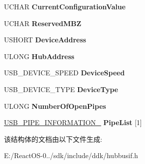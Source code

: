 \begin{DoxyCompactItemize}
U\+C\+H\+AR {\bfseries Current\+Configuration\+Value}
\item 
\mbox{\label{struct___u_s_b___d_e_v_i_c_e___i_n_f_o_r_m_a_t_i_o_n__0_af675a993c8131768d2fb1d2ddbf6871f}} 
U\+C\+H\+AR {\bfseries Reserved\+M\+BZ}
\item 
\mbox{\label{struct___u_s_b___d_e_v_i_c_e___i_n_f_o_r_m_a_t_i_o_n__0_a1e09fe3e7b8dc224665526937130a1e4}} 
U\+S\+H\+O\+RT {\bfseries Device\+Address}
\item 
\mbox{\label{struct___u_s_b___d_e_v_i_c_e___i_n_f_o_r_m_a_t_i_o_n__0_ac5866ef095055cfd24660c3d5ed287cd}} 
U\+L\+O\+NG {\bfseries Hub\+Address}
\item 
\mbox{\label{struct___u_s_b___d_e_v_i_c_e___i_n_f_o_r_m_a_t_i_o_n__0_a1c03de1128fbc85b3750c3e202f8ee24}} 
U\+S\+B\+\_\+\+D\+E\+V\+I\+C\+E\+\_\+\+S\+P\+E\+ED {\bfseries Device\+Speed}
\item 
\mbox{\label{struct___u_s_b___d_e_v_i_c_e___i_n_f_o_r_m_a_t_i_o_n__0_a6aa8ad8e4b25876c65af164bf9dfd7f8}} 
U\+S\+B\+\_\+\+D\+E\+V\+I\+C\+E\+\_\+\+T\+Y\+PE {\bfseries Device\+Type}
\item 
\mbox{\label{struct___u_s_b___d_e_v_i_c_e___i_n_f_o_r_m_a_t_i_o_n__0_a8712224a9846fc397bbb8ab40de83e06}} 
U\+L\+O\+NG {\bfseries Number\+Of\+Open\+Pipes}
\item 
\mbox{\label{struct___u_s_b___d_e_v_i_c_e___i_n_f_o_r_m_a_t_i_o_n__0_a95a86ab7d8dca8aa1cd2e1b1c1e713ed}} 
\hyperlink{struct___u_s_b___p_i_p_e___i_n_f_o_r_m_a_t_i_o_n__0}{U\+S\+B\+\_\+\+P\+I\+P\+E\+\_\+\+I\+N\+F\+O\+R\+M\+A\+T\+I\+O\+N\+\_} {\bfseries Pipe\+List} \mbox{[}1\mbox{]}
\end{DoxyCompactItemize}


该结构体的文档由以下文件生成\+:\begin{DoxyCompactItemize}
\item 
E\+:/\+React\+O\+S-\/0../sdk/include/ddk/hubbusif.\+h\end{DoxyCompactItemize}
